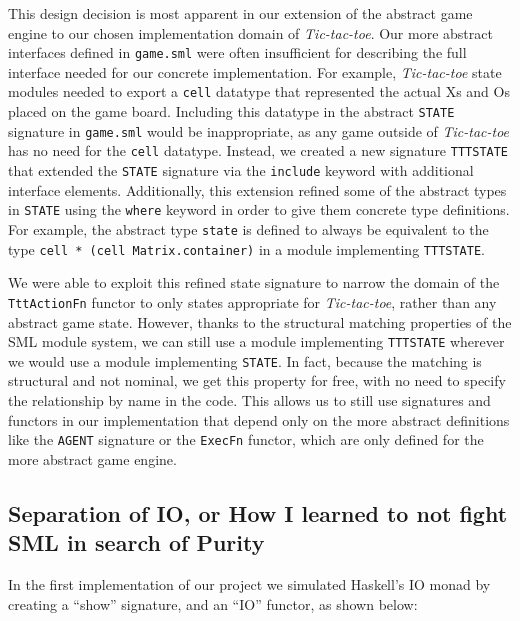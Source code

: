 \documentclass[9pt,letterpaper]{extarticle}
\begin{document}
  This design decision is most apparent in our extension of the abstract game engine to
  our chosen implementation domain of \textit{Tic-tac-toe}. Our more abstract interfaces defined
  in \texttt{game.sml} were often insufficient for describing the full interface
  needed for our concrete implementation. For example, \textit{Tic-tac-toe} state modules
  needed to export a \texttt{cell} datatype that represented the actual Xs and Os placed on the game
  board. Including this datatype in the abstract \texttt{STATE} signature in \texttt{game.sml}
  would be inappropriate, as any game outside of \textit{Tic-tac-toe} has no need for the
  \texttt{cell} datatype. Instead, we created a new signature \texttt{TTTSTATE} that extended
  the \texttt{STATE} signature via the \texttt{include} keyword with additional interface elements.
  Additionally, this extension refined
  some of the abstract types in \texttt{STATE} using the \texttt{where} keyword in order to give them
  concrete type definitions. For example, the abstract type \texttt{state} is defined to always be
  equivalent to the type \texttt{cell * (cell Matrix.container)} in a module implementing \texttt{TTTSTATE}.
  
  We were able to exploit this refined state signature to narrow the domain of the \texttt{TttActionFn}
  functor to only states appropriate for \textit{Tic-tac-toe}, rather than any abstract game state.
  However, thanks to the structural matching properties of the SML module system, we can still
  use a module implementing \texttt{TTTSTATE} wherever we would use a module implementing
  \texttt{STATE}. In fact, because the matching is structural and not nominal, we get this property
  for free, with no need to specify the relationship by name in the code. This allows us to still use
  signatures and functors in our implementation that depend only on the more abstract 
  definitions like the \texttt{AGENT} signature
  or the \texttt{ExecFn} functor, which are only defined for the more abstract game engine. 
  
  \subsection{Separation of IO, or How I learned to not fight SML in search of Purity}
  In the first implementation of our project we simulated Haskell's IO monad by
  creating a ``show'' signature, and an ``IO'' functor, as shown below:
\end{document}
